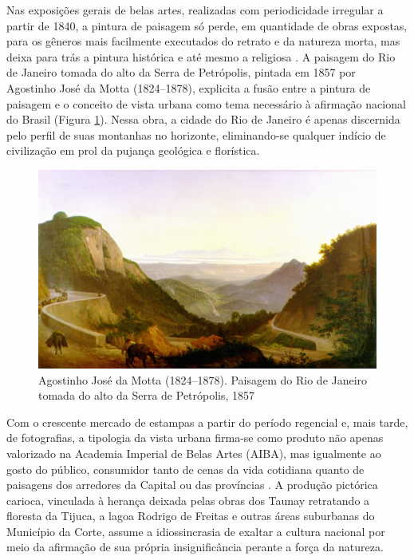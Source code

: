 Nas exposições gerais de belas artes, realizadas com periodicidade
irregular a partir de 1840, a pintura de paisagem só perde, em
quantidade de obras expostas, para os gêneros mais facilmente executados
do retrato e da natureza morta, mas deixa para trás a pintura histórica
e até mesmo a religiosa \autocite{squeff:2012galeria}. A paisagem do Rio
de Janeiro tomada do alto da Serra de Petrópolis, pintada em 1857 por
Agostinho José da Motta (1824--1878), explicita a fusão entre a pintura
de paisagem e o conceito de vista urbana como tema necessário à
afirmação nacional do Brasil (Figura \ref{fig:motta}). Nessa obra, a
cidade do Rio de Janeiro é apenas discernida pelo perfil de suas
montanhas no horizonte, eliminando-se qualquer indício de civilização em
prol da pujança geológica e florística.

\begin{figure}
\hypertarget{fig:motta}{%
\centering
\includegraphics{figures/Agostinho_Jose_da_Mota_-_Paisagem_do_Rio_de_Janeiro.jpg}
\caption{Agostinho José da Motta (1824--1878). Paisagem do Rio de
Janeiro tomada do alto da Serra de Petrópolis, 1857}\label{fig:motta}
}
\end{figure}

Com o crescente mercado de estampas a partir do período regencial e,
mais tarde, de fotografias, a tipologia da vista urbana firma-se como
produto não apenas valorizado na Academia Imperial de Belas Artes
(AIBA), mas igualmente ao gosto do público, consumidor tanto de cenas da
vida cotidiana quanto de paisagens dos arredores da Capital ou das
províncias \autocite[p.~56]{turazzi:2009iconografia}. A produção
pictórica carioca, vinculada à herança deixada pelas obras dos Taunay
retratando a floresta da Tijuca, a lagoa Rodrigo de Freitas e outras
áreas suburbanas do Município da Corte, assume a idiossincrasia de
exaltar a cultura nacional por meio da afirmação de sua própria
insignificância perante a força da natureza.

